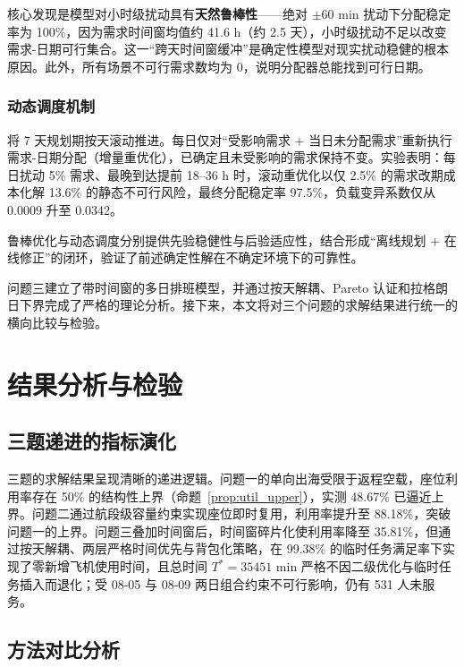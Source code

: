 核心发现是模型对小时级扰动具有\textbf{天然鲁棒性}——绝对 $\pm$60 min 扰动下分配稳定率为 100\%，因为需求时间窗均值约 41.6 h（约 2.5 天），小时级扰动不足以改变需求-日期可行集合。这一``跨天时间窗缓冲''是确定性模型对现实扰动稳健的根本原因。此外，所有场景不可行需求数均为 0，说明分配器总能找到可行日期。

\subsubsection{动态调度机制}

将 7 天规划期按天滚动推进。每日仅对``受影响需求 + 当日未分配需求''重新执行需求-日期分配（增量重优化），已确定且未受影响的需求保持不变。实验表明：每日扰动 5\% 需求、最晚到达提前 18--36 h 时，滚动重优化以仅 2.5\% 的需求改期成本化解 13.6\% 的静态不可行风险，最终分配稳定率 97.5\%，负载变异系数仅从 0.0009 升至 0.0342。

鲁棒优化与动态调度分别提供先验稳健性与后验适应性，结合形成``离线规划 + 在线修正''的闭环，验证了前述确定性解在不确定环境下的可靠性。

问题三建立了带时间窗的多日排班模型，并通过按天解耦、Pareto 认证和拉格朗日下界完成了严格的理论分析。接下来，本文将对三个问题的求解结果进行统一的横向比较与检验。

\section{结果分析与检验}

\subsection{三题递进的指标演化}

三题的求解结果呈现清晰的递进逻辑。问题一的单向出海受限于返程空载，座位利用率存在 50\% 的结构性上界（命题~\ref{prop:util_upper}），实测 48.67\% 已逼近上界。问题二通过航段级容量约束实现座位即时复用，利用率提升至 88.18\%，突破问题一的上界。问题三叠加时间窗后，时间窗碎片化使利用率降至 35.81\%，但通过按天解耦、两层严格时间优先与背包化策略，在 99.38\% 的临时任务满足率下实现了零新增飞机使用时间，且总时间 $T^* = 35451$ min 严格不因二级优化与临时任务插入而退化；受 08-05 与 08-09 两日组合约束不可行影响，仍有 531 人未服务。

\subsection{方法对比分析}

